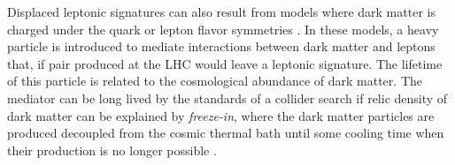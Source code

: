 Displaced leptonic signatures can also result from models where dark matter is charged under the quark or lepton flavor symmetries \cite{Agrawal_2012}. In these models, a heavy particle is introduced to mediate interactions between dark matter and leptons that, if pair produced at the \ac{LHC} would leave a leptonic signature. The lifetime of this particle is related to the cosmological abundance of dark matter. The mediator can be long lived by the standards of a collider search if relic density of dark matter can be explained by \emph{freeze-in}, where the dark matter particles are produced decoupled from the cosmic thermal bath until some cooling time when their production is no longer possible \cite{Hall_2010}.





